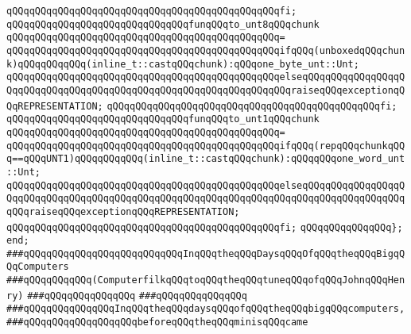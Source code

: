 \verb|qQQqqQQqqQQqqQQqqQQqqQQqqQQqqQQqqQQqqQQqqQQqqQQqfi;|\newline
\newline
\verb|qQQqqQQqqQQqqQQqqQQqqQQqqQQqqQQqfunqQQqto_unt8qQQqchunk|\newline
\verb|qQQqqQQqqQQqqQQqqQQqqQQqqQQqqQQqqQQqqQQqqQQqqQQq=|\newline
\verb|qQQqqQQqqQQqqQQqqQQqqQQqqQQqqQQqqQQqqQQqqQQqqQQqifqQQq(unboxedqQQqchunk)qQQqqQQqqQQq(inline_t::castqQQqchunk):qQQqone_byte_unt::Unt;|\newline
\verb|qQQqqQQqqQQqqQQqqQQqqQQqqQQqqQQqqQQqqQQqqQQqqQQqelseqQQqqQQqqQQqqQQqqQQqqQQqqQQqqQQqqQQqqQQqqQQqqQQqqQQqqQQqqQQqqQQqqQQqraiseqQQqexceptionqQQqREPRESENTATION;|\newline
\verb|qQQqqQQqqQQqqQQqqQQqqQQqqQQqqQQqqQQqqQQqqQQqqQQqfi;|\newline
\newline
\verb|qQQqqQQqqQQqqQQqqQQqqQQqqQQqqQQqfunqQQqto_unt1qQQqchunk|\newline
\verb|qQQqqQQqqQQqqQQqqQQqqQQqqQQqqQQqqQQqqQQqqQQqqQQq=|\newline
\verb|qQQqqQQqqQQqqQQqqQQqqQQqqQQqqQQqqQQqqQQqqQQqqQQqifqQQq(repqQQqchunkqQQq==qQQqUNT1)qQQqqQQqqQQq(inline_t::castqQQqchunk):qQQqqQQqone_word_unt::Unt;|\newline
\verb|qQQqqQQqqQQqqQQqqQQqqQQqqQQqqQQqqQQqqQQqqQQqqQQqelseqQQqqQQqqQQqqQQqqQQqqQQqqQQqqQQqqQQqqQQqqQQqqQQqqQQqqQQqqQQqqQQqqQQqqQQqqQQqqQQqqQQqqQQqqQQqraiseqQQqexceptionqQQqREPRESENTATION;|\newline
\verb|qQQqqQQqqQQqqQQqqQQqqQQqqQQqqQQqqQQqqQQqqQQqqQQqfi;|\newline
\newline
\verb|qQQqqQQqqQQqqQQq};|\newline
\verb|end;|\newline
\newline
\newline
\newline
\verb|###qQQqqQQqqQQqqQQqqQQqqQQqqQQqInqQQqtheqQQqDaysqQQqOfqQQqtheqQQqBigqQQqComputers|\newline
\verb|###qQQqqQQqqQQq(ComputerfilkqQQqtoqQQqtheqQQqtuneqQQqofqQQqJohnqQQqHenry)|\newline
\verb|###qQQqqQQqqQQqqQQq|\newline
\verb|###qQQqqQQqqQQqqQQq|\newline
\verb|###qQQqqQQqqQQqqQQqInqQQqtheqQQqdaysqQQqofqQQqtheqQQqbigqQQqcomputers,|\newline
\verb|###qQQqqQQqqQQqqQQqqQQqbeforeqQQqtheqQQqminisqQQqcame|\newline
